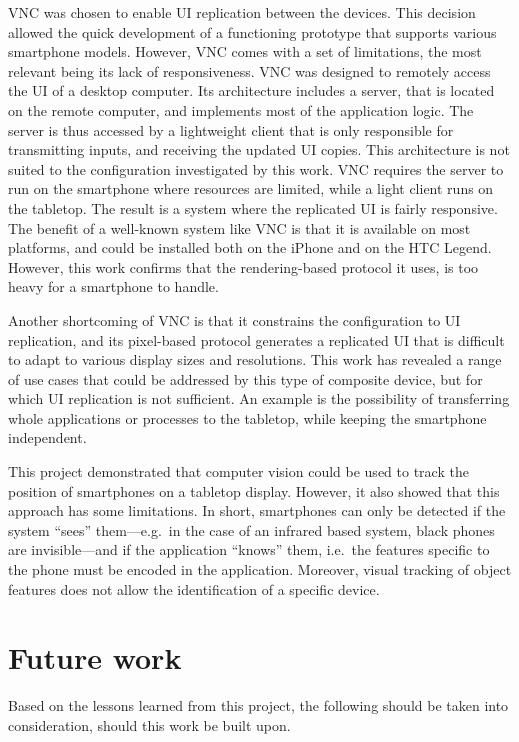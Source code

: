 VNC \citep{Richardson:1998:vnc} was chosen to enable UI replication between the devices.
This decision allowed the quick development of a functioning prototype that supports various smartphone models.
However, VNC comes with a set of limitations, the most relevant being its lack of responsiveness.
VNC was designed to remotely access the UI of a desktop computer.
Its architecture includes a server, that is located on the remote computer, and implements most of the application logic.
The server is thus accessed by a lightweight client that is only responsible for transmitting inputs, and receiving the updated UI copies.
This architecture is not suited to the configuration investigated by this work.
VNC requires the server to run on the smartphone where resources are limited, while a light client runs on the tabletop.
The result is a system where the replicated UI is fairly responsive.
The benefit of a well-known system like VNC is that it is available on most platforms, and could be installed both on the iPhone and on the HTC Legend.
However, this work confirms that the rendering-based protocol it uses, is too heavy for a smartphone to handle.

Another shortcoming of VNC is that it constrains the configuration to UI replication, and its pixel-based protocol generates a replicated UI that is difficult to adapt to various display sizes and resolutions.
This work has revealed a range of use cases that could be addressed by this type of composite device, but for which UI replication is not sufficient.
An example is the possibility of transferring whole applications or processes to the tabletop, while keeping the smartphone independent.

This project demonstrated that computer vision could be used to track the position of smartphones on a tabletop display.
However, it also showed that this approach has some limitations.
In short, smartphones can only be detected if the system ``sees'' them---e.g.\ in the case of an infrared based system, black phones are invisible---and if the application ``knows'' them, i.e.\ the features specific to the phone must be encoded in the application.
Moreover, visual tracking of object features does not allow the identification of a specific device.


\section{Future work}
\label{sec:fw}

Based on the lessons learned from this project, the following should be taken into consideration, should this work be built upon.

